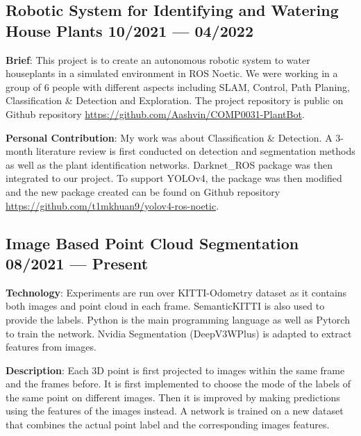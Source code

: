 
\subsection{{Robotic System for Identifying and Watering House Plants 
    \hfill 10/2021 --- 04/2022}}
\begin{zitemize}
    \item \textbf{Brief}: 
        This project is to create an autonomous robotic system to water houseplants
        in a simulated environment in ROS Noetic. 
        We were working in a group of 6 people with different aspects including
        SLAM, Control, Path Planing, Classification \& Detection and Exploration.
        The project repository is public on Github repository
        \url{https://github.com/Aashvin/COMP0031-PlantBot}.
    \item \textbf{Personal Contribution}: 
        My work was about Classification \& Detection. 
        A 3-month literature review is first conducted on detection and 
        segmentation methods as well as the plant identification networks.
        Darknet\_ROS package was then integrated to our project. 
        To support YOLOv4, the package was then modified and the new package 
        created can be found on Github repository
        \url{https://github.com/t1mkhuan9/yolov4-ros-noetic}.

\end{zitemize}

\subsection{{Image Based Point Cloud Segmentation 
    \hfill 08/2021 --- Present}}
\begin{zitemize}
    \item \textbf{Technology}: Experiments are run over KITTI-Odometry dataset 
        as it contains both images and point cloud in each frame.
        SemanticKITTI is also used to provide the labels.
        Python is the main programming language as well as Pytorch to train
        the network.
        Nvidia Segmentation (DeepV3WPlus) is adapted to extract features from 
        images.
    \item \textbf{Description}: Each 3D point is first projected to images within
        the same frame and the frames before. 
        It is first implemented to choose the mode of the labels of the same point
        on different images. 
        Then it is improved by making predictions using the features of the images
        instead.
        A network is trained on a new dataset that combines the actual point
        label and the corresponding images features. 
\end{zitemize}
